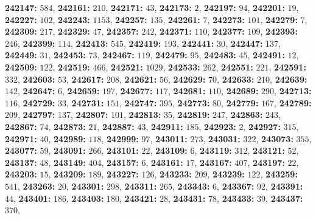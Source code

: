 \textsf{\bfseries 242147:} $584$, \textsf{\bfseries 242161:} $210$, \textsf{\bfseries 242171:} $43$, \textsf{\bfseries 242173:} $2$, \textsf{\bfseries 242197:} $94$, \textsf{\bfseries 242201:} $19$, \textsf{\bfseries 242227:} $102$, \textsf{\bfseries 242243:} $1153$, \textsf{\bfseries 242257:} $135$, \textsf{\bfseries 242261:} $7$, \textsf{\bfseries 242273:} $101$, \textsf{\bfseries 242279:} $7$, \textsf{\bfseries 242309:} $217$, \textsf{\bfseries 242329:} $47$, \textsf{\bfseries 242357:} $242$, \textsf{\bfseries 242371:} $110$, \textsf{\bfseries 242377:} $109$, \textsf{\bfseries 242393:} $246$, \textsf{\bfseries 242399:} $114$, \textsf{\bfseries 242413:} $545$, \textsf{\bfseries 242419:} $193$, \textsf{\bfseries 242441:} $30$, \textsf{\bfseries 242447:} $137$, \textsf{\bfseries 242449:} $31$, \textsf{\bfseries 242453:} $73$, \textsf{\bfseries 242467:} $119$, \textsf{\bfseries 242479:} $95$, \textsf{\bfseries 242483:} $45$, \textsf{\bfseries 242491:} $12$, \textsf{\bfseries 242509:} $122$, \textsf{\bfseries 242519:} $466$, \textsf{\bfseries 242521:} $1029$, \textsf{\bfseries 242533:} $262$, \textsf{\bfseries 242551:} $221$, \textsf{\bfseries 242591:} $332$, \textsf{\bfseries 242603:} $53$, \textsf{\bfseries 242617:} $208$, \textsf{\bfseries 242621:} $56$, \textsf{\bfseries 242629:} $70$, \textsf{\bfseries 242633:} $210$, \textsf{\bfseries 242639:} $142$, \textsf{\bfseries 242647:} $6$, \textsf{\bfseries 242659:} $197$, \textsf{\bfseries 242677:} $117$, \textsf{\bfseries 242681:} $110$, \textsf{\bfseries 242689:} $290$, \textsf{\bfseries 242713:} $116$, \textsf{\bfseries 242729:} $33$, \textsf{\bfseries 242731:} $151$, \textsf{\bfseries 242747:} $395$, \textsf{\bfseries 242773:} $80$, \textsf{\bfseries 242779:} $167$, \textsf{\bfseries 242789:} $209$, \textsf{\bfseries 242797:} $137$, \textsf{\bfseries 242807:} $101$, \textsf{\bfseries 242813:} $35$, \textsf{\bfseries 242819:} $247$, \textsf{\bfseries 242863:} $243$, \textsf{\bfseries 242867:} $74$, \textsf{\bfseries 242873:} $21$, \textsf{\bfseries 242887:} $43$, \textsf{\bfseries 242911:} $185$, \textsf{\bfseries 242923:} $2$, \textsf{\bfseries 242927:} $315$, \textsf{\bfseries 242971:} $40$, \textsf{\bfseries 242989:} $118$, \textsf{\bfseries 242999:} $97$, \textsf{\bfseries 243011:} $273$, \textsf{\bfseries 243031:} $322$, \textsf{\bfseries 243073:} $355$, \textsf{\bfseries 243077:} $59$, \textsf{\bfseries 243091:} $266$, \textsf{\bfseries 243101:} $22$, \textsf{\bfseries 243109:} $6$, \textsf{\bfseries 243119:} $312$, \textsf{\bfseries 243121:} $52$, \textsf{\bfseries 243137:} $48$, \textsf{\bfseries 243149:} $404$, \textsf{\bfseries 243157:} $6$, \textsf{\bfseries 243161:} $17$, \textsf{\bfseries 243167:} $407$, \textsf{\bfseries 243197:} $22$, \textsf{\bfseries 243203:} $15$, \textsf{\bfseries 243209:} $189$, \textsf{\bfseries 243227:} $126$, \textsf{\bfseries 243233:} $209$, \textsf{\bfseries 243239:} $122$, \textsf{\bfseries 243259:} $541$, \textsf{\bfseries 243263:} $20$, \textsf{\bfseries 243301:} $298$, \textsf{\bfseries 243311:} $265$, \textsf{\bfseries 243343:} $6$, \textsf{\bfseries 243367:} $92$, \textsf{\bfseries 243391:} $44$, \textsf{\bfseries 243401:} $186$, \textsf{\bfseries 243403:} $180$, \textsf{\bfseries 243421:} $28$, \textsf{\bfseries 243431:} $78$, \textsf{\bfseries 243433:} $39$, \textsf{\bfseries 243437:} $370$, 
